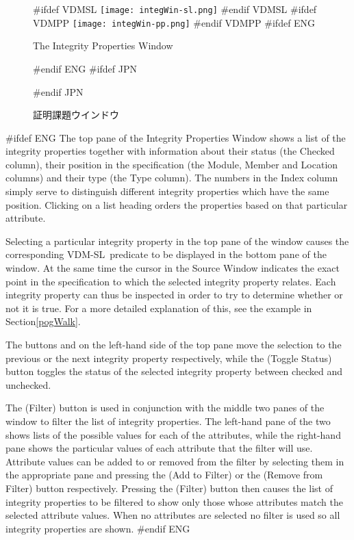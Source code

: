 \documentclass[\pformat,12pt]{article}
\newcommand{\vdmslpp}{VDM-SL}
\newcommand{\vdmslpp}{VDM++}
\newcommand{\guicmd}[1]{{\sf #1}}
\newcommand{\guicmd}[1]{{\gt #1}}
\begin{document}
\begin{figure}[tbh]
\begin{center}
#ifdef VDMSL
\texttt{[image: integWin-sl.png]}
#endif VDMSL
#ifdef VDMPP
\texttt{[image: integWin-pp.png]}
#endif VDMPP
#ifdef ENG
\caption{The Integrity Properties Window}
#endif ENG
#ifdef JPN
\caption{証明課題ウインドウ}
#endif JPN
\label{fig:integWin2}
\end{center}
\end{figure}

#ifdef ENG
The top pane of the \guicmd{Integrity Properties Window} shows a list
of the integrity properties together with information about their
status (the \guicmd{Checked} column), their position in the
specification (the \guicmd{Module}, \guicmd{Member} and
\guicmd{Location} columns) and 
their type (the \guicmd{Type} column). The numbers in the
\guicmd{Index} column simply serve to distinguish different integrity
properties which have the same position. Clicking on a list heading
orders the properties based on that particular attribute.

Selecting a particular integrity property in the top pane of the
window causes the corresponding \vdmslpp\ predicate to be displayed in
the bottom pane of the window. At the same time the cursor in the
\guicmd{Source Window} indicates the exact point in the specification to
which the selected integrity property relates. Each integrity property
can thus be inspected in order to try to determine whether or not it
is true. For a more detailed explanation of this, see the example in
Section\ref{pogWalk}.

The buttons 
 and
 on the
left-hand side of the top pane move the selection to the previous or
the next integrity property respectively, while the 
(\guicmd{Toggle Status}) button toggles the status of the selected
integrity property between checked and unchecked.

The
(\guicmd{Filter}) button is used in conjunction with the middle two
panes of the window to filter the list of integrity properties. The
left-hand pane of the two shows lists of the possible values for each
of 
the attributes, while the right-hand pane shows the particular values
of each attribute that the filter will use. Attribute values can be
added to or removed from the filter by selecting them in the
appropriate pane and pressing the 
(\guicmd{Add to Filter}) or the 
(\guicmd{Remove from Filter}) button respectively. Pressing the 
(\guicmd{Filter}) button then causes the list of integrity properties
to be filtered to show only those whose attributes match the selected
attribute values. When no attributes are selected no filter is used so
all integrity properties are shown.
#endif ENG
\end{document}
